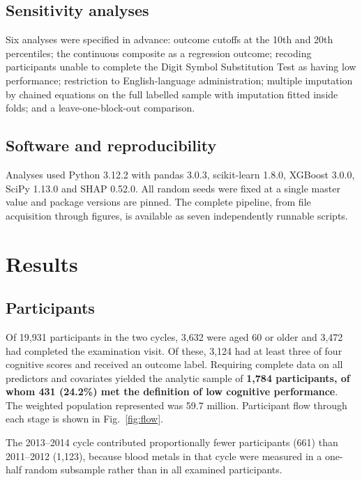 \documentclass[12pt]{article}
\begin{document}
\subsection*{Sensitivity analyses}

Six analyses were specified in advance: outcome cutoffs at the 10th and 20th percentiles; the continuous composite as a regression outcome; recoding participants unable to complete the Digit Symbol Substitution Test as having low performance; restriction to English-language administration; multiple imputation by chained equations on the full labelled sample with imputation fitted inside folds; and a leave-one-block-out comparison.

\subsection*{Software and reproducibility}

Analyses used Python 3.12.2 with pandas 3.0.3, scikit-learn 1.8.0, XGBoost 3.0.0, SciPy 1.13.0 and SHAP 0.52.0. All random seeds were fixed at a single master value and package versions are pinned. The complete pipeline, from file acquisition through figures, is available as seven independently runnable scripts.

\section*{Results}

\subsection*{Participants}

Of 19,931 participants in the two cycles, 3,632 were aged 60 or older and 3,472 had completed the examination visit. Of these, 3,124 had at least three of four cognitive scores and received an outcome label. Requiring complete data on all predictors and covariates yielded the analytic sample of \textbf{1,784 participants, of whom 431 (24.2\%) met the definition of low cognitive performance}. The weighted population represented was 59.7 million. Participant flow through each stage is shown in Fig.~\ref{fig:flow}.

The 2013--2014 cycle contributed proportionally fewer participants (661) than 2011--2012 (1,123), because blood metals in that cycle were measured in a one-half random subsample rather than in all examined participants.
\end{document}
